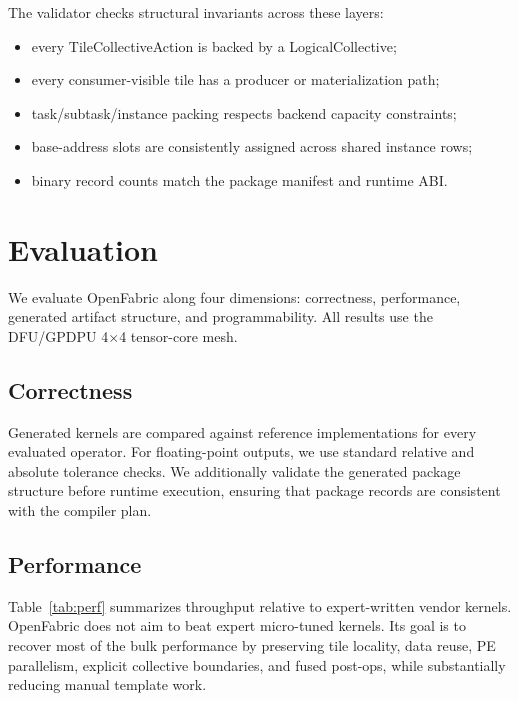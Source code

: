 \documentclass[conference]{IEEEtran}
\newcommand{\systemname}{OpenFabric}
\newcommand{\targetbackend}{DFU/GPDPU}
\newcommand{\meshsize}{4$\times$4}
\begin{document}
The validator checks structural invariants across these layers:
\begin{itemize}
\item every TileCollectiveAction is backed by a LogicalCollective;
\item every consumer-visible tile has a producer or materialization path;
\item task/subtask/instance packing respects backend capacity constraints;
\item base-address slots are consistently assigned across shared instance rows;
\item binary record counts match the package manifest and runtime ABI.
\end{itemize}

\section{Evaluation}

We evaluate \systemname{} along four dimensions: correctness, performance,
generated artifact structure, and programmability. All results use the
\targetbackend{} \meshsize{} tensor-core mesh.

\subsection{Correctness}

Generated kernels are compared against reference implementations for every
evaluated operator. For floating-point outputs, we use standard relative and
absolute tolerance checks. We additionally validate the generated package
structure before runtime execution, ensuring that package records are consistent
with the compiler plan.

\subsection{Performance}

Table~\ref{tab:perf} summarizes throughput relative to expert-written vendor
kernels. \systemname{} does not aim to beat expert micro-tuned kernels. Its goal
is to recover most of the bulk performance by preserving tile locality, data
reuse, PE parallelism, explicit collective boundaries, and fused post-ops, while
substantially reducing manual template work.
\end{document}
